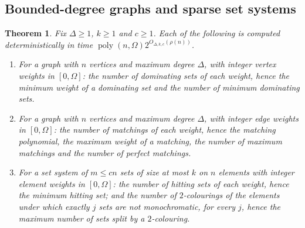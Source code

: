 \documentclass[11pt,reqno]{amsart}
\numberwithin{equation}{section}
\theoremstyle{plain}
\newtheorem{theorem}{Theorem}[section]
\theoremstyle{definition}
\theoremstyle{remark}
\DeclareMathOperator{\poly}{poly}
\newcommand{\rhon}{\rho}
\begin{document}
\subsection{Bounded-degree graphs and sparse set systems}\label{ssec:bounded}
\begin{theorem}\label{thm:bounded}
Fix $\Delta\ge1$, $k\ge1$ and $c\ge1$. Each of the following is computed
deterministically in time $\poly(n,\Omega)2^{O_{\Delta,k,c}(\rhon(n))}$.
\begin{enumerate}[label=(\roman*),leftmargin=2.2em]
\item\label{it:dom} For a graph with $n$ vertices and maximum degree $\Delta$,
with integer vertex weights in $[0,\Omega]$: the number of dominating sets of each
weight, hence the minimum weight of a dominating set and the number of minimum
dominating sets.
\item\label{it:match} For a graph with $n$ vertices and maximum degree $\Delta$,
with integer edge weights in $[0,\Omega]$: the number of matchings of each weight,
hence the matching polynomial, the maximum weight of a matching, the number of
maximum matchings and the number of perfect matchings.
\item\label{it:hit} For a set system of $m\le cn$ sets of size at most $k$ on $n$
elements with integer element weights in $[0,\Omega]$: the number of hitting
sets of each weight, hence the minimum hitting set; and the number of
$2$-colourings of the elements under which exactly $j$ sets are not
monochromatic, for every $j$, hence the maximum number of sets split by a
$2$-colouring.
\end{enumerate}
\end{theorem}
\end{document}
